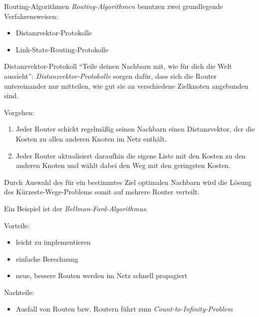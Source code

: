 \begin{defi}{Routing-Algorithmen}
    \emph{Routing-Algorithmen} benutzen zwei grundlegende Verfahrensweisen:
    \begin{itemize}
        \item Distanzvektor-Protokolle
        \item Link-State-Routing-Protokolle
    \end{itemize}
\end{defi}

\begin{defi}{Distanzvektor-Protokoll}
    \enquote{Teile deinen Nachbarn mit, wie für dich die Welt aussieht}: \emph{Distanzvektor-Protokolle} sorgen dafür, dass sich die Router untereinander nur mitteilen, wie gut sie an verschiedene Zielknoten angebunden sind.

    Vorgehen:
    \begin{enumerate}
        \item Jeder Router schickt regelmäßig seinen Nachbarn einen Distanzvektor, der die Kosten zu allen anderen Knoten im Netz enthält.
        \item Jeder Router aktualisiert daraufhin die eigene Liste mit den Kosten zu den anderen Knoten und wählt dabei den Weg mit den geringsten Kosten.
    \end{enumerate}

    Durch Auswahl des für ein bestimmtes Ziel optimalen Nachbarn wird die Lösung des Kürzeste-Wege-Problems somit auf mehrere Router verteilt.

    Ein Beispiel ist der \emph{Bellman-Ford-Algorithmus}.

    Vorteile:
    \begin{itemize}
        \item leicht zu implementieren
        \item einfache Berechnung
        \item neue, bessere Routen werden im Netz schnell propagiert
    \end{itemize}

    Nachteile:
    \begin{itemize}
        \item Ausfall von Routen bzw. Routern führt zum \emph{Count-to-Infinity-Problem}
    \end{itemize}
\end{defi}


